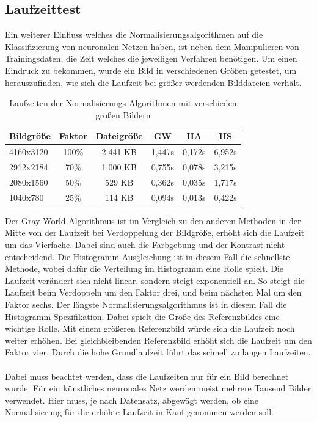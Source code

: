 \documentclass[a4paper,12pt,oneside]{article}
\begin{document}
\subsection{Laufzeittest}
Ein weiterer Einfluss welches die Normalisierungsalgorithmen auf die Klassifizierung von neuronalen Netzen haben, ist neben dem Manipulieren von Trainingsdaten, die Zeit welches die jeweiligen Verfahren benötigen. Um einen Eindruck zu bekommen, wurde ein Bild in verschiedenen Größen getestet, um herauszufinden, wie sich die Laufzeit bei größer werdenden Bilddateien verhält.
\begin{table}
[h]
\caption{Laufzeiten der Normalisierungs-Algorithmen mit verschieden großen Bildern}
\centering
\begin{tabular}{|l|c|c|c|c|c|}
\hline
Bildgröße & Faktor & Dateigröße & GW & HA & HS\\
\hline
4160x3120 & 100\% & 2.441 KB & 1,447s & 0,172s & 6,952s\\
2912x2184 & 70\% & 1.000 KB & 0,755s & 0,078s & 3,215s\\
2080x1560 & 50\% & 529 KB & 0,362s & 0,035s & 1,717s\\
1040x780 & 25\% & 114 KB & 0,094s & 0,013s & 0,422s\\
\hline
\end{tabular}
\end{table}
Der Gray World Algorithmus ist im Vergleich zu den anderen Methoden in der Mitte von der Laufzeit bei Verdoppelung der Bildgröße, erhöht sich die Laufzeit um das Vierfache. Dabei sind auch die Farbgebung und der Kontrast nicht entscheidend. Die Histogramm Ausgleichung ist in diesem Fall die schnellste Methode, wobei dafür die Verteilung im Histogramm eine Rolle spielt. Die Laufzeit verändert sich nicht linear, sondern steigt exponentiell an. So steigt die Laufzeit beim Verdoppeln um den Faktor drei, und beim nächsten Mal um den Faktor sechs. Der längste Normalisierungsalgorithmus ist in diesem Fall die Histogramm Spezifikation. Dabei spielt die Größe des Referenzbildes eine wichtige Rolle. Mit einem größeren Referenzbild würde sich die Laufzeit noch weiter erhöhen. Bei gleichbleibenden Referenzbild erhöht sich die Laufzeit um den Faktor vier. Durch die hohe Grundlaufzeit führt das schnell zu langen Laufzeiten.\\\\
Dabei muss beachtet werden, dass die Laufzeiten nur für ein Bild berechnet wurde. Für ein künstliches neuronales Netz werden meist mehrere Tausend Bilder verwendet. Hier muss, je nach Datensatz, abgewägt werden, ob eine Normalisierung für die erhöhte Laufzeit in Kauf genommen werden soll.
\newpage   
\end{document}
